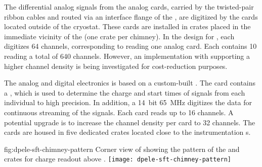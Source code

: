 The differential analog signals from the analog  cards, carried by the twisted-pair ribbon cables and routed via an interface flange of the , are digitized by the  cards located %
outside of the cryostat. These cards are %
installed in  crates placed in the immediate vicinity of the  (one crate per chimney). %
In the design for , each  digitizes \num{64} channels, corresponding to reading one  analog card. Each   contains \num{10}  reading a total of \num{640} channels. However, an implementation with  supporting a higher channel density is being investigated for cost-reduction purposes. 

The   analog and digital electronics is based on a custom-built . The card contains a   \cite{Blin:2017}, which is used to determine %
the charge and start times of signals from each individual  to high precision. In addition, a \SI{14}{bit} \SI{65}{MHz}  digitizes the data for continuous streaming of the  signals. Each card reads up to \num{16} channels. A potential %
upgrade is to increase the channel density per card to \num{32} channels. The  cards are housed in five dedicated  crates located close to the  instrumentation \fdth{}s.

\begin{dunefigure}{fig:dpele-sft-chimney-pattern}
{Corner view of  showing the pattern of the  and  crates for charge readout above .}
\texttt{[image: dpele-sft-chimney-pattern]}
\end{dunefigure}


